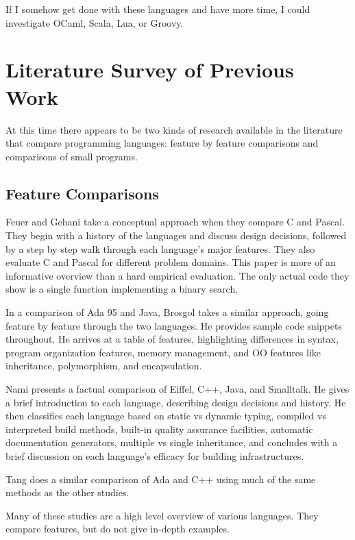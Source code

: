 \documentclass{article}
\begin{document}
If I somehow get done with these languages and have more time, I could
investigate OCaml, Scala, Lua, or Groovy.

\section{Literature Survey of Previous Work}

At this time there appears to be two kinds of research available in the
literature that compare programming languages: feature by feature comparisons
and comparisons of small programs.

\subsection{Feature Comparisons}

Feuer and Gehani take a conceptual approach when they compare C and
Pascal.\cite{FeuerCVsPascal}  They begin with a history of the languages and
discuss design decisions, followed by a step by step walk through each
language's major features.  They also evaluate C and Pascal for different
problem domains.  This paper is more of an informative overview than a hard
empirical evaluation.  The only actual code they show is a single function
implementing a binary search.

In a comparison of Ada 95 and Java, Brosgol takes a similar
approach,\cite{BrosgolCompOOAdaVsJava} going feature by feature through the two
languages.  He provides sample code snippets throughout.  He arrives at a table
of features, highlighting differences in syntax, program organization features,
memory management, and OO features like inheritance, polymorphism, and
encapsulation.

Nami presents a factual comparison of Eiffel, C++, Java, and
Smalltalk\cite{NamiCompOOSoftEng}.  He gives a brief introduction to each
language, describing design decisions and history.  He then classifies each
language based on static vs dynamic typing, compiled vs interpreted build
methods, built-in quality assurance facilities, automatic documentation
generators, multiple vs single inheritance, and concludes with a brief
discussion on each language's efficacy for building infrastructures.

Tang does a similar comparison of Ada and C++ using much of the same methods as
the other studies.\cite{TangAdaVsCpp}

Many of these studies are a high level overview of various languages.  They
compare features, but do not give in-depth examples.
\end{document}
